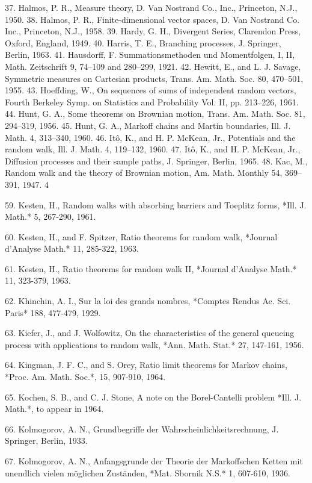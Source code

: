 37. Halmos, P. R., Measure theory, D. Van Nostrand Co., Inc., Princeton, N.J., 1950.
38. Halmos, P. R., Finite-dimensional vector spaces, D. Van Nostrand Co. Inc., Princeton, N.J., 1958.
39. Hardy, G. H., Divergent Series, Clarendon Press, Oxford, England, 1949.
40. Harris, T. E., Branching processes, J. Springer, Berlin, 1963.
41. Hausdorff, F. Summationsmethoden und Momentfolgen, I, II, Math. Zeitschrift 9, 74–109 and 280–299, 1921.
42. Hewitt, E., and L. J. Savage, Symmetric measures on Cartesian products, Trans. Am. Math. Soc. 80, 470–501, 1955.
43. Hoeffding, W., On sequences of sums of independent random vectors, Fourth Berkeley Symp. on Statistics and Probability Vol. II, pp. 213–226, 1961.
44. Hunt, G. A., Some theorems on Brownian motion, Trans. Am. Math. Soc. 81, 294–319, 1956.
45. Hunt, G. A., Markoff chains and Martin boundaries, Ill. J. Math. 4, 313–340, 1960.
46. Itô, K., and H. P. McKean, Jr., Potentials and the random walk, Ill. J. Math. 4, 119–132, 1960.
47. Itô, K., and H. P. McKean, Jr., Diffusion processes and their sample paths, J. Springer, Berlin, 1965.
48. Kac, M., Random walk and the theory of Brownian motion, Am. Math. Monthly 54, 369–391, 1947.
4

59. Kesten, H., Random walks with absorbing barriers and Toeplitz forms, *Ill. J. Math.* 5, 267-290, 1961.

60. Kesten, H., and F. Spitzer, Ratio theorems for random walk, *Journal d'Analyse Math.* 11, 285-322, 1963.

61. Kesten, H., Ratio theorems for random walk II, *Journal d'Analyse Math.* 11, 323-379, 1963.

62. Khinchin, A. I., Sur la loi des grands nombres, *Comptes Rendus Ac. Sci. Paris* 188, 477-479, 1929.

63. Kiefer, J., and J. Wolfowitz, On the characteristics of the general queueing process with applications to random walk, *Ann. Math. Stat.* 27, 147-161, 1956.

64. Kingman, J. F. C., and S. Orey, Ratio limit theorems for Markov chains, *Proc. Am. Math. Soc.*, 15, 907-910, 1964.

65. Kochen, S. B., and C. J. Stone, A note on the Borel-Cantelli problem *Ill. J. Math.*, to appear in 1964.

66. Kolmogorov, A. N., Grundbegriffe der Wahrscheinlichkeitsrechnung, J. Springer, Berlin, 1933.

67. Kolmogorov, A. N., Anfangsgrunde der Theorie der Markoffschen Ketten mit unendlich vielen möglichen Zuständen, *Mat. Sbornik N.S.* 1, 607-610, 1936.

